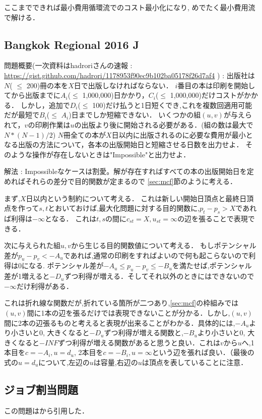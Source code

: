 \documentclass[13pt]{jarticle}
\theoremstyle{nonitalic} %
\begin{document}
ここまでできれば最小費用循環流でのコスト最小化になり, めでたく最小費用流で解ける．

\subsection{Bangkok Regional 2016 J }
\label{prob:bangkok}
問題概要(一次資料はhadroriさんの速報 : \url{https://gist.github.com/hadrori/1178953f90ec9b102ba05178f26d7af4} ) : 
出版社は$N$( $\leq$ 200)冊の本を$X$日で出版しなければならない．
$i$番目の本は印刷を開始してから出版までに$A_i$($\leq$ 1,000,000)日かかり，$C_i$($\leq$ 1,000,000)だけコストがかかる．
しかし，追加で$D_i$($\leq$ 100)だけ払うと1日短くでき,これを複数回適用可能だが最短で$B_i$($\leq$ $A_i$)日までしか短縮できない．
いくつかの組$(u,v)$が与えられて，$v$の印刷作業は$u$の出版より後に開始される必要がある．(組の数は最大で$N*(N-1)/2$)
$N$冊全ての本が$X$日以内に出版されるのに必要な費用が最小となる出版の方法について，各本の出版開始日と短縮させる日数を出力せよ．
そのような操作が存在しないときは"Impossible"と出力せよ．

解法 : 
Impossibleなケースは割愛。解が存在すればすべての本の出版開始日を定めればそれらの差分で目的関数が定まるので \ref{sec:mcf}節のように考える．

まず,$X$日以内という制約について考える．
これは新しい開始日頂点と最終日頂点を作って$s,t$とおいておけば,最大化問題に対する目的関数に,$p_t - p_s > X $であれば利得は$- \infty$となる．
これは$t,s$の間に$c_{st} = X, u_{st}=\infty$の辺を張ることで表現できる．

次に与えられた組$u,v$から生じる目的関数値について考える．
もしポテンシャル差が$p_u - p_v < -A_u$であれば,通常の印刷をすればよいので何も起こらないので利得は0になる. ポテンシャル差が$-A_u \leq p_u - p_v \leq  -B_u$を満たせば,ポテンシャル差が1増えると$-D_u$ずつ利得が増える．そしてそれ以外のときにはできないので$-\infty$だけ利得がある．

これは折れ線な関数だが,折れている箇所が二つあり,\ref{sec:mcf}の枠組みでは$(u,v)$間に1本の辺を張るだけでは表現できないことが分かる．しかし,$(u,v)$間に2本の辺張るものと考えると表現が出来ることがわかる．具体的には,$-A_u$より小さいと0, 大きくなると$-D_u$ずつ利得が増える関数と,$-B_u$より小さいと0, 大きくなると$-INF$ずつ利得が増える関数があると思うと良い．これは$v$から$u$へ,1本目を$c = -A_i, u=d_u$, 2本目を$c=-B_i, u=\infty$という辺を張れば良い．（最後の式の$u=d_u$について,左辺の$u$は容量,右辺の$u$は頂点を表していることに注意．


\subsection{ジョブ割当問題}
この問題は\cite{combopt}から引用した．\\
\end{document}
